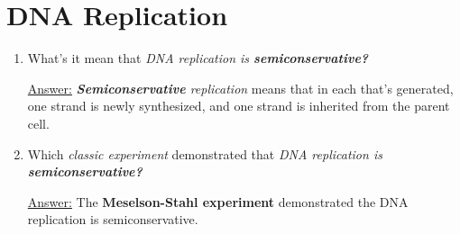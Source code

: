 \documentclass{article}
\newenvironment{QandA}{\begin{enumerate}[label=\bfseries Q\arabic*.]}
                       {\end{enumerate}}
\newenvironment{answered}{\par\normalfont\underline{Answer:}}{}
\begin{document}
\section{DNA Replication}
\begin{QandA}
  \item{What's it mean that \textit{DNA replication is \textbf{semiconservative?}}}
    \begin{answered}
    \textit{\textbf{Semiconservative} replication} means that in each  that's generated, one strand is newly synthesized, and one strand is inherited from the parent cell.
    \end{answered}
  \item{Which \textit{classic experiment} demonstrated that \textit{DNA replication is \textbf{semiconservative?}}}
    \begin{answered}
    The \textbf{Meselson-Stahl experiment} demonstrated the DNA replication is semiconservative.
    \end{answered}
\end{QandA}
\end{document}
